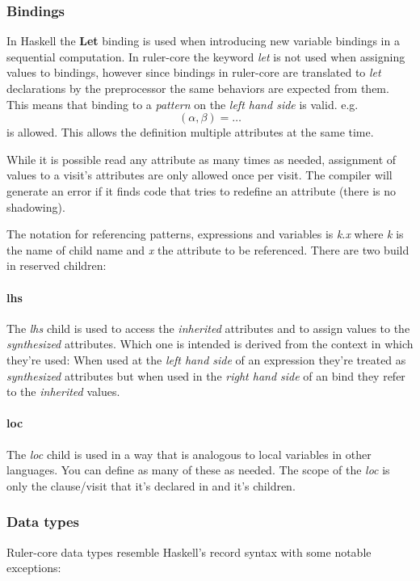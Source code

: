 \subsubsection{Bindings}
In Haskell the \textbf{Let} binding is used when introducing new variable bindings in a sequential computation. In ruler-core the keyword \emph{let} is not used when assigning values to bindings, however since bindings in ruler-core are translated to \emph{let} declarations by the preprocessor the same behaviors are expected from them. This means that binding to a \emph{pattern} on the \emph{left hand side} is valid. e.g. \[ (\alpha, \beta) = \ldots \] is allowed. This allows the definition multiple attributes at the same time.

While it is possible read any attribute as many times as needed, assignment of values to a visit's attributes are only allowed once per visit. The compiler will generate an error if it finds code that tries to redefine an attribute (there is no shadowing).

The notation for referencing patterns, expressions and variables is \emph{k}.\emph{x} where \emph{k} is the name of child name and \emph{x} the attribute to be referenced. There are two build in reserved children:

\paragraph{lhs}
The \emph{lhs} child is used to access the \emph{inherited} attributes and to assign values to the \emph{synthesized} attributes. Which one is intended is derived from the context in which they're used: When used at the \emph{left hand side} of an expression they're treated as \emph{synthesized} attributes but when used in the \emph{right hand side} of an bind they refer to the \emph{inherited} values.
 
\paragraph{loc}
The \emph{loc} child is used in a way that is analogous to local variables in other languages. You can define as many of these as needed. The scope of the \emph{loc} is only the clause/visit that it's declared in and it's children.
\subsubsection{Data types}
Ruler-core data types resemble Haskell's record syntax with some notable exceptions:

